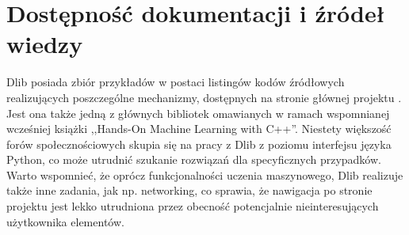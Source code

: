 
\section{Dostępność dokumentacji i źródeł wiedzy}

Dlib posiada zbiór przykładów w postaci listingów kodów źródłowych realizujących poszczególne mechanizmy, dostępnych na stronie głównej projektu \cite{dlib:home}. Jest ona także jedną z głównych bibliotek omawianych w ramach wspomnianej wcześniej książki ,,Hands-On Machine Learning with C++''. Niestety większość forów społecznościowych skupia się na pracy z Dlib z poziomu interfejsu języka Python, co może utrudnić szukanie rozwiązań dla specyficznych przypadków. Warto wspomnieć, że oprócz funkcjonalności uczenia maszynowego, Dlib realizuje także inne zadania, jak np. networking, co sprawia, że nawigacja po stronie projektu jest lekko utrudniona przez obecność potencjalnie nieinteresujących użytkownika elementów.